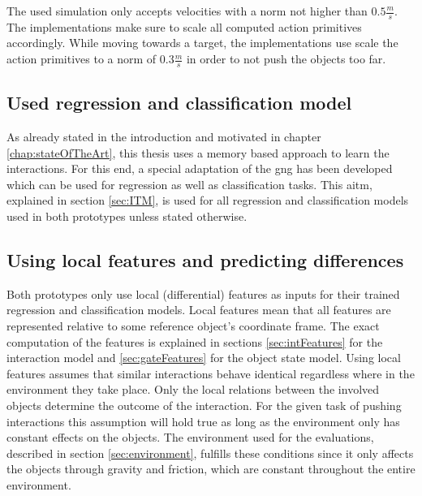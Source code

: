 The used simulation only accepts velocities with a norm not higher than $0.5\frac{m}{s}$. The implementations make sure to scale all computed action primitives accordingly. While moving towards a target, the implementations use scale the action primitives to a norm of $0.3\frac{m}{s}$ in order to not push the objects too far.

\subsection{Used regression and classification model}

As already stated in the introduction and motivated in chapter \ref{chap:stateOfTheArt}, this thesis uses a memory based approach to learn the interactions. For this end, a special adaptation of the \gls{gng} has been developed which can be used for regression as well as classification tasks. This \gls{aitm}, explained in section \ref{sec:ITM}, is used for all regression and classification models used in both prototypes unless stated otherwise. 

\subsection{Using local features and predicting differences \label{sec:localFeatures}}
Both prototypes only use local (differential) features as inputs for their trained regression and classification models. 
Local features mean that all features are represented relative to some reference object's coordinate frame. The exact computation of the features is explained in sections \ref{sec:intFeatures} for the interaction model and \ref{sec:gateFeatures} for the object state model.
Using local features assumes that similar interactions behave identical regardless where in the environment they take place. 
Only the local relations between the involved objects determine the outcome of the interaction. 
For the given task of pushing interactions this assumption will hold true as long as the environment only has constant effects on the objects. The environment used for the evaluations, described in section \ref{sec:environment}, fulfills these conditions since it only affects the objects through gravity and friction, which are constant throughout the entire environment. 


